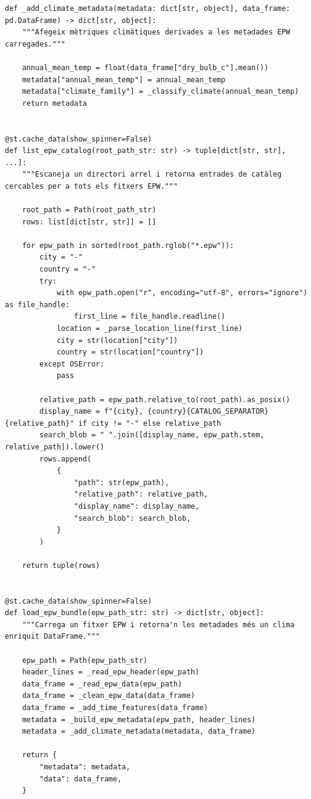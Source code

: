 \documentclass[10pt,a4paper]{article}
\begin{document}
\begin{lstlisting}[style=studioPython,caption={backend/visor\_epw\_backend.py},label={lst:backend-visor-epw-backend-py}]
def _add_climate_metadata(metadata: dict[str, object], data_frame: pd.DataFrame) -> dict[str, object]:
    """Afegeix mètriques climàtiques derivades a les metadades EPW carregades."""

    annual_mean_temp = float(data_frame["dry_bulb_c"].mean())
    metadata["annual_mean_temp"] = annual_mean_temp
    metadata["climate_family"] = _classify_climate(annual_mean_temp)
    return metadata


@st.cache_data(show_spinner=False)
def list_epw_catalog(root_path_str: str) -> tuple[dict[str, str], ...]:
    """Escaneja un directori arrel i retorna entrades de catàleg cercables per a tots els fitxers EPW."""

    root_path = Path(root_path_str)
    rows: list[dict[str, str]] = []

    for epw_path in sorted(root_path.rglob("*.epw")):
        city = "-"
        country = "-"
        try:
            with epw_path.open("r", encoding="utf-8", errors="ignore") as file_handle:
                first_line = file_handle.readline()
            location = _parse_location_line(first_line)
            city = str(location["city"])
            country = str(location["country"])
        except OSError:
            pass

        relative_path = epw_path.relative_to(root_path).as_posix()
        display_name = f"{city}, {country}{CATALOG_SEPARATOR}{relative_path}" if city != "-" else relative_path
        search_blob = " ".join([display_name, epw_path.stem, relative_path]).lower()
        rows.append(
            {
                "path": str(epw_path),
                "relative_path": relative_path,
                "display_name": display_name,
                "search_blob": search_blob,
            }
        )

    return tuple(rows)


@st.cache_data(show_spinner=False)
def load_epw_bundle(epw_path_str: str) -> dict[str, object]:
    """Carrega un fitxer EPW i retorna'n les metadades més un clima enriquit DataFrame."""

    epw_path = Path(epw_path_str)
    header_lines = _read_epw_header(epw_path)
    data_frame = _read_epw_data(epw_path)
    data_frame = _clean_epw_data(data_frame)
    data_frame = _add_time_features(data_frame)
    metadata = _build_epw_metadata(epw_path, header_lines)
    metadata = _add_climate_metadata(metadata, data_frame)

    return {
        "metadata": metadata,
        "data": data_frame,
    }



\end{lstlisting}
\end{document}
